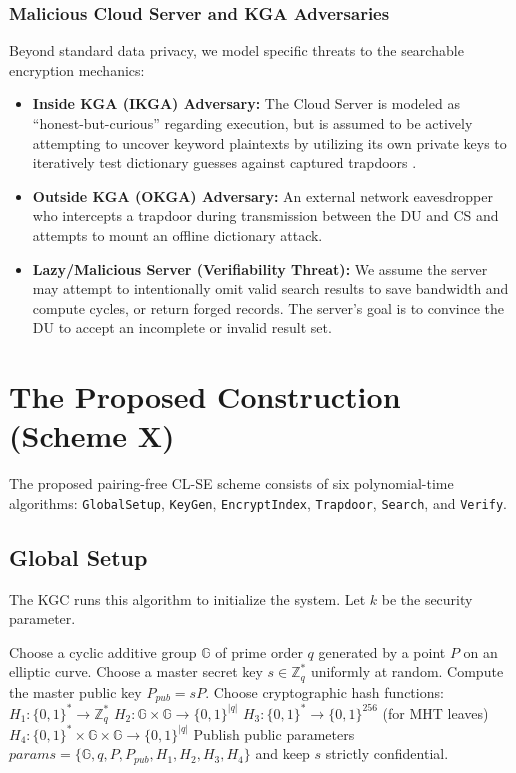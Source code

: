 \documentclass[10pt,journal,compsoc]{IEEEtran}
\begin{document}
\subsubsection{Malicious Cloud Server and KGA Adversaries}
Beyond standard data privacy, we model specific threats to the searchable encryption mechanics:
\begin{itemize}
    \item \textbf{Inside KGA (IKGA) Adversary:} The Cloud Server is modeled as ``honest-but-curious'' regarding execution, but is assumed to be actively attempting to uncover keyword plaintexts by utilizing its own private keys to iteratively test dictionary guesses against captured trapdoors \cite{lu2023certificateless}.
    \item \textbf{Outside KGA (OKGA) Adversary:} An external network eavesdropper who intercepts a trapdoor during transmission between the DU and CS and attempts to mount an offline dictionary attack.
    \item \textbf{Lazy/Malicious Server (Verifiability Threat):} We assume the server may attempt to intentionally omit valid search results to save bandwidth and compute cycles, or return forged records. The server's goal is to convince the DU to accept an incomplete or invalid result set.
\end{itemize}


\section{The Proposed Construction (Scheme X)}\label{sec:proposed}

The proposed pairing-free CL-SE scheme consists of six polynomial-time algorithms: \texttt{GlobalSetup}, \texttt{KeyGen}, \texttt{EncryptIndex}, \texttt{Trapdoor}, \texttt{Search}, and \texttt{Verify}.

\subsection{Global Setup}
The KGC runs this algorithm to initialize the system. Let $k$ be the security parameter.
\begin{algorithm}[H]
\caption{GlobalSetup($1^k$)}
\begin{algorithmic}[1]
\State Choose a cyclic additive group $\mathbb{G}$ of prime order $q$ generated by a point $P$ on an elliptic curve.
\State Choose a master secret key $s \in \mathbb{Z}_q^*$ uniformly at random.
\State Compute the master public key $P_{pub} = sP$.
\State Choose cryptographic hash functions:
    \Statex $H_1: \{0,1\}^* \rightarrow \mathbb{Z}_q^*$
    \Statex $H_2: \mathbb{G} \times \mathbb{G} \rightarrow \{0,1\}^{|q|}$
    \Statex $H_3: \{0,1\}^* \rightarrow \{0,1\}^{256}$ (for MHT leaves)
    \Statex $H_4: \{0,1\}^* \times \mathbb{G} \times \mathbb{G} \rightarrow \{0,1\}^{|q|}$
\State Publish public parameters $params = \{\mathbb{G}, q, P, P_{pub}, H_1, H_2, H_3, H_4\}$ and keep $s$ strictly confidential.
\end{algorithmic}
\end{algorithm}
\end{document}
